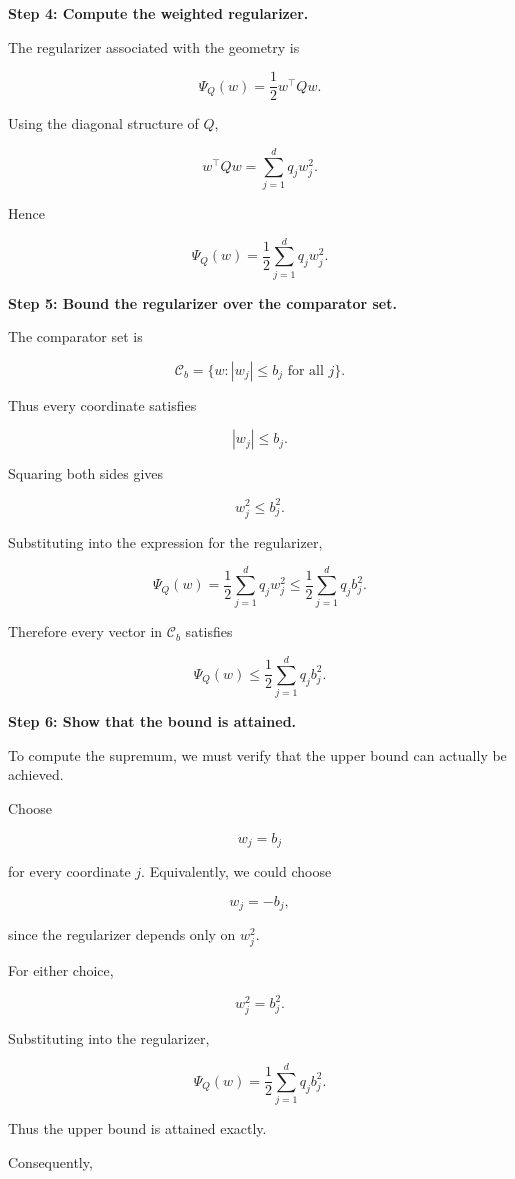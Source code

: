 \documentclass[11pt]{article}
\begin{document}
\begin{enumerate}
\begin{solutionbox}
\textbf{Step 4: Compute the weighted regularizer.}

The regularizer associated with the geometry is

\[
\Psi_Q(w)
=
\frac12 w^\top Qw.
\]

Using the diagonal structure of \(Q\),

\[
w^\top Qw
=
\sum_{j=1}^{d}
q_jw_j^2.
\]

Hence

\[
\boxed{
\Psi_Q(w)
=
\frac12
\sum_{j=1}^{d}
q_j w_j^2.
}
\]

\medskip

\textbf{Step 5: Bound the regularizer over the comparator set.}

The comparator set is

\[
\mathcal C_b
=
\{
w :
|w_j|
\le
b_j
\text{ for all }j
\}.
\]

Thus every coordinate satisfies

\[
|w_j|
\le
b_j.
\]

Squaring both sides gives

\[
w_j^2
\le
b_j^2.
\]

Substituting into the expression for the regularizer,

\[
\Psi_Q(w)
=
\frac12
\sum_{j=1}^{d}
q_jw_j^2
\le
\frac12
\sum_{j=1}^{d}
q_jb_j^2.
\]

Therefore every vector in \(\mathcal C_b\) satisfies

\[
\Psi_Q(w)
\le
\frac12
\sum_{j=1}^{d}
q_jb_j^2.
\]

\medskip

\textbf{Step 6: Show that the bound is attained.}

To compute the supremum, we must verify that the upper bound can actually be achieved.

Choose

\[
w_j=b_j
\]

for every coordinate \(j\). Equivalently, we could choose

\[
w_j=-b_j,
\]

since the regularizer depends only on \(w_j^2\).

For either choice,

\[
w_j^2=b_j^2.
\]

Substituting into the regularizer,

\[
\Psi_Q(w)
=
\frac12
\sum_{j=1}^{d}
q_jb_j^2.
\]

Thus the upper bound is attained exactly.

Consequently,


\end{solutionbox}
\end{enumerate}
\end{document}
